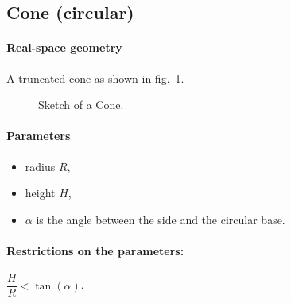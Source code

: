 \subsection{Cone (circular)}  

\paragraph{Real-space geometry}
A truncated cone as shown in fig.~\ref{fig:cone}. 

\begin{figure}[ht]
\hfill
{}
\hfill
{}
\hfill
\caption{Sketch of a Cone.}
\label{fig:cone}
\end{figure}

\paragraph{Parameters}
\begin{itemize}
\item radius $R$,
\item height $H$,
\item $\alpha$ is the angle between the side and the circular base.
\end{itemize}

\paragraph{Restrictions on the parameters:} $\dfrac{H}{R}< \tan(\alpha)$.


